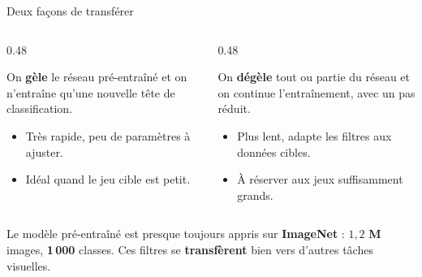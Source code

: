\begin{frame}{Deux façons de transférer}
\begin{columns}[t]
\begin{column}{0.48\textwidth}
\begin{ebox}
On \textbf{gèle} le réseau pré-entraîné et on n'entraîne qu'une nouvelle
tête de classification.
\begin{itemize}
  \item Très rapide, peu de paramètres à ajuster.
  \item Idéal quand le jeu cible est petit.
\end{itemize}
\end{ebox}
\end{column}
\begin{column}{0.48\textwidth}
\begin{ebox}
On \textbf{dégèle} tout ou partie du réseau et on continue l'entraînement,
avec un pas réduit.
\begin{itemize}
  \item Plus lent, adapte les filtres aux données cibles.
  \item À réserver aux jeux suffisamment grands.
\end{itemize}
\end{ebox}
\end{column}
\end{columns}
\vspace{1mm}
\begin{kbox}
Le modèle pré-entraîné est presque toujours appris sur \textbf{ImageNet} :
$1{,}2$ \textbf{M} images, \textbf{1\,000} classes. Ces filtres se
\textbf{transfèrent} bien vers d'autres tâches visuelles.
\end{kbox}
\end{frame}

